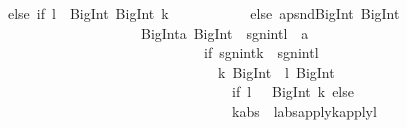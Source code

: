 \begin{isabellebody}
\begin{isamarkuptext}
\ \ \ \ else\ {}if\ {}l\ {}{}\ BigInt{}{}{}{}\ {}BigInt{}{}{}{}\ k{}\isanewline
\ \ \ \ \ \ \ \ \ \ \ else\ apsnd{}BigInt{}\ BigInt{}\isanewline
\ \ \ \ \ \ \ \ \ \ \ \ \ \ \ \ \ \ \ \ \ \ \ BigInt{}{}{}a{}\ BigInt{}\ {}{}\ sgn{}int{}l{}\ {}\ a{}\isanewline
\ \ \ \ \ \ \ \ \ \ \ \ \ \ \ \ \ \ \ \ \ \ \ \ \ \ \ \ \ \ \ \ {}if\ {}sgn{}int{}k{}\ {}{}\ sgn{}int{}l{}{}\isanewline
\ \ \ \ \ \ \ \ \ \ \ \ \ \ \ \ \ \ \ \ \ \ \ \ \ \ \ \ \ \ \ \ \ \ {}{}k{}\ BigInt{}\ {}{}\ {}l{}\ BigInt{}\ {}{}\isanewline
\ \ \ \ \ \ \ \ \ \ \ \ \ \ \ \ \ \ \ \ \ \ \ \ \ \ \ \ \ \ \ \ \ \ \ \ if\ {}l\ {}{}\ {}{}\ {}BigInt{}{}{}{}\ k{}\ else\isanewline
\ \ \ \ \ \ \ \ \ \ \ \ \ \ \ \ \ \ \ \ \ \ \ \ \ \ \ \ \ \ \ \ \ \ \ \ {}k{}abs\ {}{}\ l{}abs{}{}{}apply{}k{}{}apply{}l{}\isanewline

\end{isamarkuptext}
\end{isabellebody}
